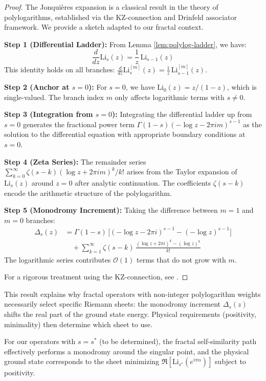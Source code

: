 \begin{proof}
The Jonquières expansion is a classical result in the theory of polylogarithms, established via the KZ-connection and Drinfeld associator framework. We provide a sketch adapted to our fractal context.

\textbf{Step 1 (Differential Ladder):} From Lemma \ref{lem:polylog-ladder}, we have:
\[
\frac{d}{dz}\mathrm{Li}_s(z) = \frac{1}{z}\,\mathrm{Li}_{s-1}(z)
\]
This identity holds on all branches: $\frac{d}{dz}\mathrm{Li}_s^{[m]}(z) = \frac{1}{z}\,\mathrm{Li}_{s-1}^{[m]}(z)$.

\textbf{Step 2 (Anchor at $s=0$):} For $s=0$, we have $\mathrm{Li}_0(z) = z/(1-z)$, which is single-valued. The branch index $m$ only affects logarithmic terms with $s\neq 0$.

\textbf{Step 3 (Integration from $s=0$):} Integrating the differential ladder up from $s=0$ generates the fractional power term $\Gamma(1-s)(-\log z - 2\pi im)^{s-1}$ as the solution to the differential equation with appropriate boundary conditions at $s=0$.

\textbf{Step 4 (Zeta Series):} The remainder series $\sum_{k=0}^\infty \zeta(s-k)(\log z + 2\pi im)^k/k!$ arises from the Taylor expansion of $\mathrm{Li}_s(z)$ around $z=0$ after analytic continuation. The coefficients $\zeta(s-k)$ encode the arithmetic structure of the polylogarithm.

\textbf{Step 5 (Monodromy Increment):} Taking the difference between $m=1$ and $m=0$ branches:
\begin{align*}
\Delta_s(z) &= \Gamma(1-s)\,\bigl[(-\log z - 2\pi i)^{s-1} - (-\log z)^{s-1}\bigr] \\
&\quad + \sum_{k=1}^\infty \zeta(s-k)\,\frac{(\log z + 2\pi i)^k - (\log z)^k}{k!}
\end{align*}
The logarithmic series contributes $\mathcal{O}(1)$ terms that do not grow with $m$.

For a rigorous treatment using the KZ-connection, see \cite{zagier1991polylogarithms}.
\end{proof}

\begin{remark}
This result explains why fractal operators with non-integer polylogarithm weights necessarily select specific Riemann sheets: the monodromy increment $\Delta_s(z)$ shifts the real part of the ground state energy. Physical requirements (positivity, minimality) then determine which sheet to use.

For our operators with $s = s^*$ (to be determined), the fractal self-similarity path effectively performs a monodromy around the singular point, and the physical ground state corresponds to the sheet minimizing $\Re[\mathrm{Li}_{s^*}(e^{i\pi\alpha})]$ subject to positivity.
\end{remark}

